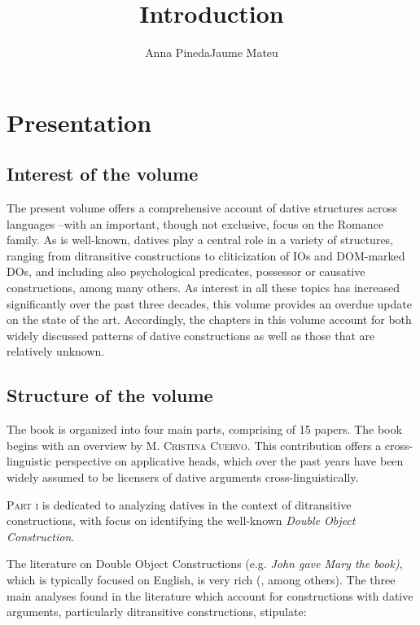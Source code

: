 \documentclass[output=paper,modfonts,nonflat,colorlinks,citecolor=brown]{langsci/langscibook}
\author{Anna Pineda\affiliation{Universitat Pompeu Fabra}\orcid{}\lastand Jaume Mateu\affiliation{Universitat Autònoma de Barcelona}\orcid{}}
\title{Introduction}
\begin{document}
\maketitle 
 


\section{Presentation}

\subsection{Interest of the volume}


The present volume offers a comprehensive account of dative structures across languages –with an important, though not exclusive, focus on the Romance family. As is well-known, datives play a central role in a variety of structures, ranging from ditransitive constructions to cliticization of IOs and DOM-marked DOs, and including also psychological predicates, possessor or causative constructions, among many others. As interest in all these topics has increased significantly over the past three decades, this volume provides an overdue update on the state of the art. Accordingly, the chapters in this volume account for both widely discussed patterns of dative constructions as well as those that are relatively unknown. 


\subsection{Structure of the volume}


The book is organized into four main parts, comprising of 15 papers. The book begins with an overview by M. \textsc{Cristina Cuervo}. This contribution offers a cross-linguistic perspective on applicative heads, which over the past years have been widely assumed to be licensers of dative arguments cross-linguistically.



\textsc{Part i} is dedicated to analyzing datives in the context of ditransitive constructions, with focus on identifying the well-known \textit{Double Object Construction}. 



The literature on Double Object Constructions (e.g. \textit{John gave Mary the book)}, which is typically focused on English, is very rich (\citealt{Larson1988,Oehrle1976,Kayne1984,Jackendoff1990structures,Jackendoff1990larson,Pesetsky1995,Harley2002}, among others). The three main analyses found in the literature which account for constructions with dative arguments, particularly ditransitive constructions, stipulate: 
\end{document}
